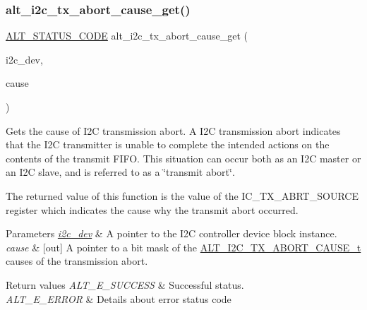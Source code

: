 \subsubsection{\texorpdfstring{alt\_i2c\_tx\_abort\_cause\_get()}{alt\_i2c\_tx\_abort\_cause\_get()}}
{\footnotesize\ttfamily \mbox{\hyperlink{hwlib_8h_abdb0d369f069723ca55d6c94bcaaaa12}{A\+L\+T\+\_\+\+S\+T\+A\+T\+U\+S\+\_\+\+C\+O\+DE}} alt\+\_\+i2c\+\_\+tx\+\_\+abort\+\_\+cause\+\_\+get (\begin{DoxyParamCaption}\item[{\mbox{\hyperlink{structALT__I2C__DEV__s}{A\+L\+T\+\_\+\+I2\+C\+\_\+\+D\+E\+V\+\_\+t}} $\ast$}]{i2c\+\_\+dev,  }\item[{\mbox{\hyperlink{group__ALT__I2C_gae7ca3bb5e96b3425588a975987407738}{A\+L\+T\+\_\+\+I2\+C\+\_\+\+T\+X\+\_\+\+A\+B\+O\+R\+T\+\_\+\+C\+A\+U\+S\+E\+\_\+t}} $\ast$}]{cause }\end{DoxyParamCaption})}

Gets the cause of I2C transmission abort. A I2C transmission abort indicates that the I2C transmitter is unable to complete the intended actions on the contents of the transmit F\+I\+FO. This situation can occur both as an I2C master or an I2C slave, and is referred to as a \char`\"{}transmit abort\char`\"{}.

The returned value of this function is the value of the I\+C\+\_\+\+T\+X\+\_\+\+A\+B\+R\+T\+\_\+\+S\+O\+U\+R\+CE register which indicates the cause why the transmit abort occurred.


\begin{DoxyParams}{Parameters}
{\em \mbox{\hyperlink{structi2c__dev}{i2c\+\_\+dev}}} & A pointer to the I2C controller device block instance.\\
\hline
{\em cause} & \mbox{[}out\mbox{]} A pointer to a bit mask of the \mbox{\hyperlink{group__ALT__I2C_gae7ca3bb5e96b3425588a975987407738}{A\+L\+T\+\_\+\+I2\+C\+\_\+\+T\+X\+\_\+\+A\+B\+O\+R\+T\+\_\+\+C\+A\+U\+S\+E\+\_\+t}} causes of the transmission abort.\\
\hline
\end{DoxyParams}

\begin{DoxyRetVals}{Return values}
{\em A\+L\+T\+\_\+\+E\+\_\+\+S\+U\+C\+C\+E\+SS} & Successful status. \\
\hline
{\em A\+L\+T\+\_\+\+E\+\_\+\+E\+R\+R\+OR} & Details about error status code \\
\hline
\end{DoxyRetVals}
